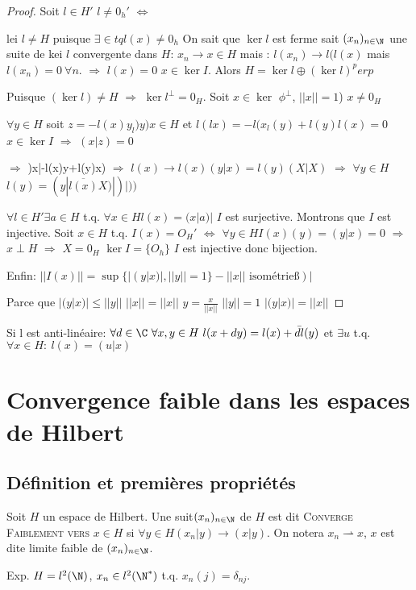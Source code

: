 \begin{proof}
	
	
	Soit $l\in H'$ $l≠0_h'$ $\Leftrightarrow$ 
	
	lei $l≠H$ puisque $\exists \in tq l(x)≠0_h$ On sait que $\ker l$ est ferme sait $(x_n)_{n\in\N}$ une suite de kei $l$ convergente dans $H$: $x_n\rightarrow x\in H$ mais : $l(x_n)\rightarrow  l(l(x)$ mais $l(x_n)=0\ \forall n$. $\Rightarrow$  $l(x)=0$ $x\in \ker I$. Alors $H=\ker l \oplus (\ker l )^perp$
	
	Puisque $(\ker l)≠H$ $\Rightarrow$  $\ker l^\perp =0_H$. Soit $x\in \ker $ $\phi ^\perp$, $||x||=1$) $x≠0_H$

	
	$\forall y\in H$ soit $z=-l(x)y_l)y)x\in H$ et $l(lx)=-l(x_l(y)+l(y)l(x)=0$ $x\in \ker I$ $\Rightarrow$  $(x|z)=0$
	
	$\Rightarrow$  )x|-l(x)y+l(y)x) $\Rightarrow$  $l(x) \rightarrow  l(x)(y|x)=l(y)(X|X)$ $\Rightarrow$ $\forall y\in H$ $l(y)=(y|\overline{l(x)}X)|)|))$
	

	$\forall l\in H' \exists a\in H$ t.q. $\forall x\in H l(x)=(x|a)|$ $I$ est surjective. Montrons que $I$ est injective.
	Soit $x\in H$ t.q. $I(x)=O_H'$ $\Leftrightarrow$ $\forall y\in H I(x)(y)=(y|x)=0$ $\Rightarrow$  $x\perp H$ $\Rightarrow$  $X=0_H$ $\ker I=\{O_h\}$ $I$ est injective donc bijection.


Enfin: $||I(x)||=\sup\{|(y|x)|, ||y||=1\} -||x||\text{ isométrieß})|$

Parce que $|(y|x)|≤||y||$ $||x||=||x||$ $y=\frac x{||x||}$ $||y||=1$ $|(y|x)|=||x||$

\end{proof}
\begin{remark}
	Si l est anti-linéaire: $\forall d\in \C\ \forall x,y\in H\ l(x+dy)=l(x)+\bar d l(y)$ et $\exists u $ t.q. $\forall x\in H:\  l(x)=(u|x)$
\end{remark}


\section{Convergence faible dans les espaces de Hilbert} %

\subsection{Définition et premières propriétés} %
\label{sub:definition_et_premieres_proprietes}

\begin{definition}
	Soit $H$ un espace de Hilbert. Une suit$ (x_n)_{n\in\N}$ de $H$ est dit \textsc{Converge Faiblement vers} $x\in H$ si $\forall y\in H (x_n|y)\rightarrow (x|y)$. On notera $x_n\rightharpoonup x$, $x$ est dite limite faible de $(x_n)_{n\in\N}$.
\end{definition}
Exp. $H=l^2(\N)$, $x_n\in l^2(\N^*)$ t.q. $x_n(j)=δ_{nj}$.

